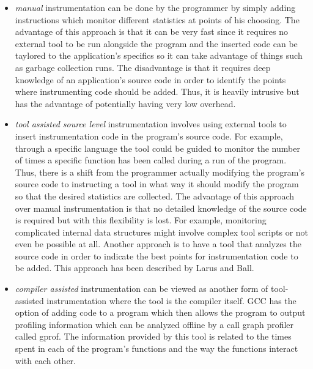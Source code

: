 \begin{itemize}
\item \textit{manual} instrumentation can be done by the programmer by simply adding instructions which monitor different statistics at points of his choosing. The advantage of this approach is that it can be very fast since it requires no external tool to be run alongside the program and the inserted code can be taylored to the application's specifics so it can take advantage of things such as garbage collection runs. The disadvantage is that it requires deep knowledge of an application's source code in order to identify the points where instrumenting code should be added. Thus, it is heavily intrusive but has the advantage of potentially having very low overhead.
\item \textit{tool assisted source level} instrumentation involves using external tools to insert instrumentation code in the program's source code. For example, through a specific language the tool could be guided to monitor the number of times a specific function has been called during a run of the program. Thus, there is a shift from the programmer actually modifying the program's source code to instructing a tool in what way it should modify the program so that the desired statistics are collected. The advantage of this approach over manual instrumentation is that no detailed knowledge of the source code is required but with this flexibility is lost. For example, monitoring complicated internal data structures might involve complex tool scripts or not even be possible at all. Another approach is to have a tool that analyzes the source code in order to indicate the best points for instrumentation code to be added. This approach has been described by Larus and Ball\cite{Ball94}.
\item \textit{compiler assisted} instrumentation can be viewed as another form of tool-assisted instrumentation where the tool is the compiler itself. GCC has the option of adding code to a program which then allows the program to output profiling information which can be analyzed offline by a call graph profiler called gprof\cite{Graham04}. The information provided by this tool is related to the times spent in each of the program's functions and the way the functions interact with each other.
\end{itemize}

